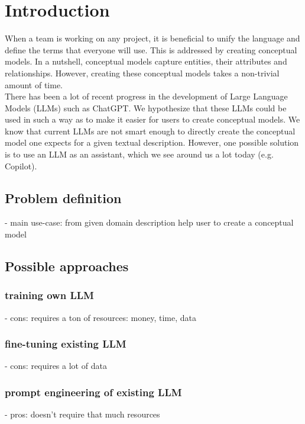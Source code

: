 \chapter*{Introduction}

When a team is working on any project, it is beneficial to unify the language and define the terms 
that everyone will use. This is addressed by creating conceptual models. In a nutshell, conceptual 
models capture entities, their attributes and relationships. However, creating these conceptual 
models takes a non-trivial amount of time. \\

There has been a lot of recent progress in the development of Large Language Models (LLMs) such 
as ChatGPT. We hypothesize that these LLMs could be used in such a way as to make it easier for 
users to create conceptual models. We know that current LLMs are not smart enough to directly 
create the conceptual model one expects for a given textual description. However, one possible 
solution is to use an LLM as an assistant, which we see around us a lot today (e.g. Copilot). 


\section*{Problem definition}

- main use-case: from given domain description help user to create a conceptual model \\


\section*{Possible approaches}


\subsection*{training own LLM}
- cons: requires a ton of resources: money, time, data


\subsection*{fine-tuning existing LLM}
- cons: requires a lot of data


\subsection*{prompt engineering of existing LLM}
- pros: doesn't require that much resources


